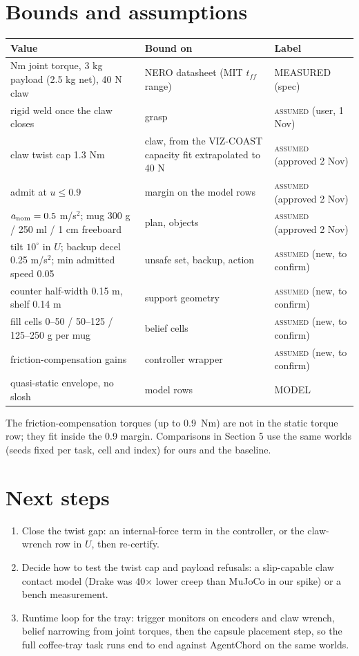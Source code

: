 \documentclass[11pt,a4paper]{article}
\newcommand{\lab}[1]{\textsc{#1}}
\begin{document}
\section{Bounds and assumptions}
\begin{center}\small
\begin{tabularx}{\linewidth}{@{}>{\raggedright\arraybackslash}p{6.4cm}Yl@{}}
\toprule
Value & Bound on & Label\\
 Nm joint torque, 3 kg payload (2.5 kg net), 40 N claw & NERO datasheet (MIT $t_{ff}$ range) & MEASURED (spec)\\
rigid weld once the claw closes & grasp & \lab{assumed} (user, 1 Nov)\\
claw twist cap 1.3 Nm & claw, from the VIZ-COAST capacity fit extrapolated to 40 N & \lab{assumed} (approved 2 Nov)\\
admit at $u\le0.9$ & margin on the model rows & \lab{assumed} (approved 2 Nov)\\
$a_{\rm nom}=0.5$ m/s$^2$; mug 300 g / 250 ml / 1 cm freeboard & plan, objects & \lab{assumed} (approved 2 Nov)\\
tilt $10^\circ$ in $U$; backup decel 0.25 m/s$^2$; min admitted speed 0.05 & unsafe set, backup, action & \lab{assumed} (new, to confirm)\\
counter half-width 0.15 m, shelf 0.14 m & support geometry & \lab{assumed} (new, to confirm)\\
fill cells 0--50 / 50--125 / 125--250 g per mug & belief cells & \lab{assumed} (new, to confirm)\\
friction-compensation gains & controller wrapper & \lab{assumed} (new, to confirm)\\
quasi-static envelope, no slosh & model rows & MODEL\\
\bottomrule
\end{tabularx}
\end{center}
The friction-compensation torques (up to 0.9~Nm) are not in the static torque row; they fit inside the 0.9 margin. Comparisons
in Section 5 use the same worlds (seeds fixed per task, cell and index) for ours and the baseline.

\section{Next steps}
\begin{enumerate}
\item Close the twist gap: an internal-force term in the controller, or the claw-wrench row in $U$, then re-certify.
\item Decide how to test the twist cap and payload refusals: a slip-capable claw contact model (Drake was 40$\times$ lower creep
than MuJoCo in our spike) or a bench measurement.
\item Runtime loop for the tray: trigger monitors on encoders and claw wrench, belief narrowing from joint torques, then the
capsule placement step, so the full coffee-tray task runs end to end against AgentChord on the same worlds.
\end{enumerate}
\end{document}
